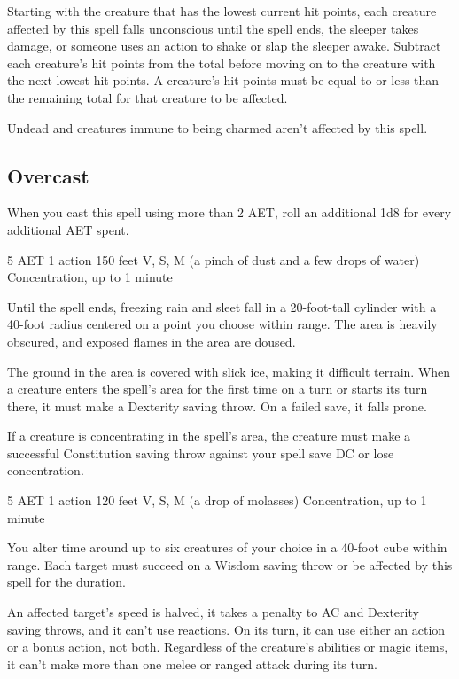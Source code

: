 Starting with the creature that has the lowest current hit points, each creature affected by this spell falls unconscious until the spell ends, the sleeper takes damage, or someone uses an action to shake or slap the sleeper awake. Subtract each creature's hit points from the total before moving on to the creature with the next lowest hit points. A creature's hit points must be equal to or less than the remaining total for that creature to be affected.

Undead and creatures immune to being charmed aren't affected by this spell.

\subsection*{Overcast} When you cast this spell using more than 2 AET, roll an additional 1d8 for every additional AET spent.

{5 AET}
{1 action}
{150 feet}
{V, S, M (a pinch of dust and a few drops of water)}
{Concentration, up to 1 minute}

Until the spell ends, freezing rain and sleet fall in a 20-foot-tall cylinder with a 40-foot radius centered on a point you choose within range. The area is heavily obscured, and exposed flames in the area are doused.

The ground in the area is covered with slick ice, making it difficult terrain. When a creature enters the spell's area for the first time on a turn or starts its turn there, it must make a Dexterity saving throw. On a failed save, it falls prone.

If a creature is concentrating in the spell's area, the creature must make a successful Constitution saving throw against your spell save DC or lose concentration.

{5 AET}
{1 action}
{120 feet}
{V, S, M (a drop of molasses)}
{Concentration, up to 1 minute}

You alter time around up to six creatures of your choice in a 40-foot cube within range. Each target must succeed on a Wisdom saving throw or be affected by this spell for the duration.

An affected target's speed is halved, it takes a  penalty to AC and Dexterity saving throws, and it can't use reactions. On its turn, it can use either an action or a bonus action, not both. Regardless of the creature's abilities or magic items, it can't make more than one melee or ranged attack during its turn.

